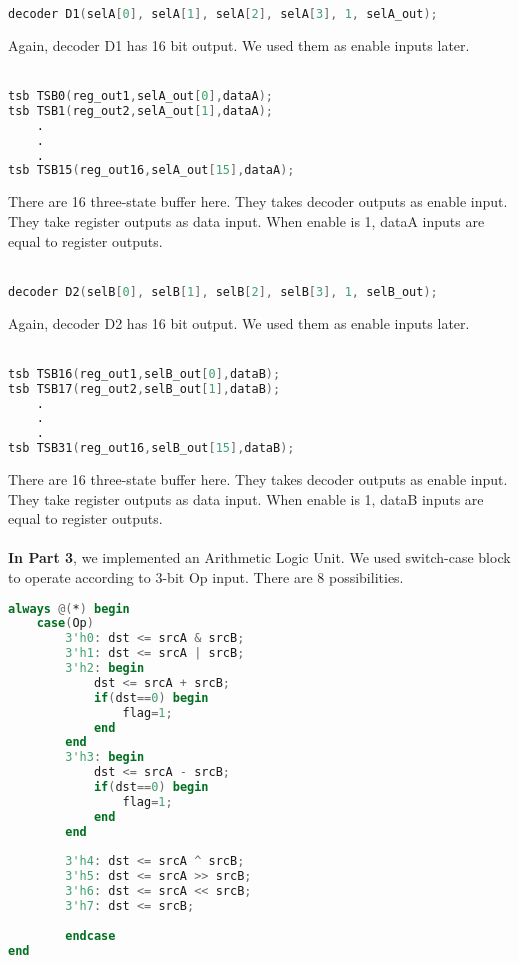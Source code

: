 \documentclass[pdftex,12pt,a4paper]{article}
\begin{document}
\begin{lstlisting}[language=Verilog, caption=Decoder]
decoder D1(selA[0], selA[1], selA[2], selA[3], 1, selA_out);
\end{lstlisting}
Again, decoder D1 has 16 bit output. We used them as enable inputs later.\\
\\

\begin{lstlisting}[language=Verilog, caption=TSB]
tsb TSB0(reg_out1,selA_out[0],dataA);
tsb TSB1(reg_out2,selA_out[1],dataA);
    .
    .
    .
tsb TSB15(reg_out16,selA_out[15],dataA);
\end{lstlisting}
There are 16 three-state buffer here. They takes decoder outputs as enable input. They take register outputs as data input. When enable is 1, dataA inputs are equal to register outputs.\\
\\

\begin{lstlisting}[language=Verilog, caption=Decoder]
decoder D2(selB[0], selB[1], selB[2], selB[3], 1, selB_out);
\end{lstlisting}
Again, decoder D2 has 16 bit output. We used them as enable inputs later.\\
\\

\begin{lstlisting}[language=Verilog, caption=TSB]
tsb TSB16(reg_out1,selB_out[0],dataB);
tsb TSB17(reg_out2,selB_out[1],dataB);
    .
    .
    .
tsb TSB31(reg_out16,selB_out[15],dataB);
\end{lstlisting}
There are 16 three-state buffer here. They takes decoder outputs as enable input. They take register outputs as data input. When enable is 1, dataB inputs are equal to register outputs.\\
\\


\textbf{In Part 3}, we implemented an Arithmetic Logic Unit. We used switch-case block to operate according to 3-bit Op input. There are 8 possibilities.

\begin{lstlisting}[language=Verilog, caption=ALU]
always @(*) begin
    case(Op) 
        3'h0: dst <= srcA & srcB; 
        3'h1: dst <= srcA | srcB; 
        3'h2: begin
            dst <= srcA + srcB;
            if(dst==0) begin
                flag=1;
            end
        end
        3'h3: begin
            dst <= srcA - srcB;
            if(dst==0) begin
                flag=1;
            end
        end
        
        3'h4: dst <= srcA ^ srcB;
        3'h5: dst <= srcA >> srcB;
        3'h6: dst <= srcA << srcB;
        3'h7: dst <= srcB;
        
        endcase
end

\end{lstlisting}
\end{document}
